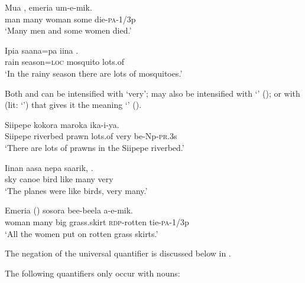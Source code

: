 \ea%
\label{ex:x100}
\gll Mua , emeria  um-e-mik. \\
man many woman some die-\textsc{pa}-1/3p\\
\glt`Many men and some women died.'
\z

\ea%
\label{ex:x667}
\gll Ipia saana=pa iina . \\
rain season=\textsc{loc} mosquito lots.of\\
\glt`In the rainy season there are lots of mosquitoes.'
\z

Both  and  can be intensified with  `very';  may also be intensified with  `' (); or with  (lit: `') that gives it the meaning `' ().

\ea%
\label{ex:x809}
\gll Siipepe kokora maroka   ika-i-ya. \\
Siipepe riverbed prawn lots.of very be-Np-\textsc{pr}.3s\\
\glt`There are lots of prawns in the Siipepe riverbed.'
\z

\ea%
\label{ex:x101}
\gll Iinan aasa nepa saarik,  . \\
sky canoe bird like many very\\
\glt`The planes were like birds, very many.'
\z

\ea%
\label{ex:x102}
\gll Emeria ()  sosora bee-beela a-e-mik. \\
woman many big grass.skirt \textsc{rdp}-rotten tie-\textsc{pa}-1/3p\\
\glt`All the women put on rotten grass skirts.'
\z

The negation of the universal quantifier is discussed below in .

The following quantifiers only occur with  nouns:


